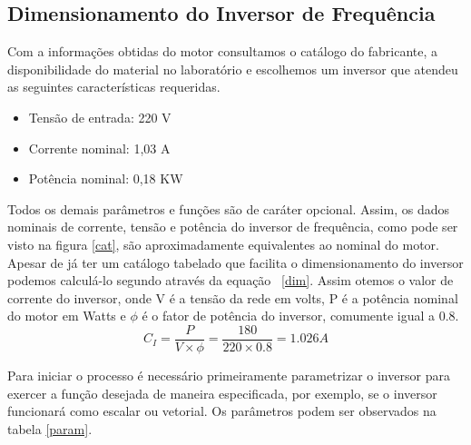 \documentclass[a4paper, 12pt,oneside, english, brazil]{abntex2}
\begin{document}
\subsection{Dimensionamento do Inversor de Frequência}
Com a informações obtidas do motor consultamos o catálogo do fabricante, a disponibilidade do material no laboratório e escolhemos um inversor que atendeu as seguintes características requeridas.

\begin{itemize}
    \item Tensão de entrada: 220 V
    \item Corrente nominal: 1,03 A
    \item Potência nominal: 0,18 KW
\end{itemize}

Todos os demais parâmetros e funções são de caráter opcional. Assim, os dados nominais de corrente, tensão e potência do inversor de frequência, como pode ser visto na figura \ref{cat}, são aproximadamente equivalentes ao nominal do motor. 
Apesar de já ter um catálogo tabelado que facilita o dimensionamento do inversor podemos calculá-lo segundo  através da equação ~\eqref{dim}. Assim otemos o valor de corrente do inversor, onde V é a tensão da rede em volts, P é a potência nominal do motor em Watts e $\phi$ é o fator de potência do inversor, comumente igual a 0.8.
\begin{equation}
C_{I}=\frac{P}{V \times \phi}= \frac{180}{220 \times 0.8}= 1.026 A
    \label{dim}
\end{equation}

Para iniciar o processo é necessário primeiramente parametrizar o inversor para exercer a função desejada de maneira especificada, por exemplo, se o inversor funcionará como escalar ou vetorial. Os parâmetros podem ser observados na tabela \ref{param}.
\end{document}
